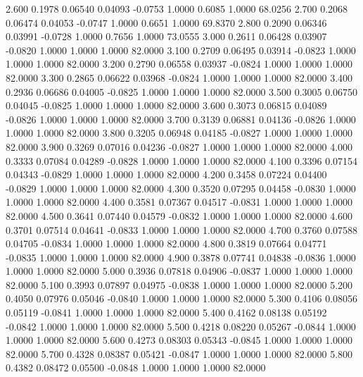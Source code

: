    2.600   0.1978   0.06540   0.04093  -0.0753   1.0000   0.6085   1.0000  68.0256
   2.700   0.2068   0.06474   0.04053  -0.0747   1.0000   0.6651   1.0000  69.8370
   2.800   0.2090   0.06346   0.03991  -0.0728   1.0000   0.7656   1.0000  73.0555
   3.000   0.2611   0.06428   0.03907  -0.0820   1.0000   1.0000   1.0000  82.0000
   3.100   0.2709   0.06495   0.03914  -0.0823   1.0000   1.0000   1.0000  82.0000
   3.200   0.2790   0.06558   0.03937  -0.0824   1.0000   1.0000   1.0000  82.0000
   3.300   0.2865   0.06622   0.03968  -0.0824   1.0000   1.0000   1.0000  82.0000
   3.400   0.2936   0.06686   0.04005  -0.0825   1.0000   1.0000   1.0000  82.0000
   3.500   0.3005   0.06750   0.04045  -0.0825   1.0000   1.0000   1.0000  82.0000
   3.600   0.3073   0.06815   0.04089  -0.0826   1.0000   1.0000   1.0000  82.0000
   3.700   0.3139   0.06881   0.04136  -0.0826   1.0000   1.0000   1.0000  82.0000
   3.800   0.3205   0.06948   0.04185  -0.0827   1.0000   1.0000   1.0000  82.0000
   3.900   0.3269   0.07016   0.04236  -0.0827   1.0000   1.0000   1.0000  82.0000
   4.000   0.3333   0.07084   0.04289  -0.0828   1.0000   1.0000   1.0000  82.0000
   4.100   0.3396   0.07154   0.04343  -0.0829   1.0000   1.0000   1.0000  82.0000
   4.200   0.3458   0.07224   0.04400  -0.0829   1.0000   1.0000   1.0000  82.0000
   4.300   0.3520   0.07295   0.04458  -0.0830   1.0000   1.0000   1.0000  82.0000
   4.400   0.3581   0.07367   0.04517  -0.0831   1.0000   1.0000   1.0000  82.0000
   4.500   0.3641   0.07440   0.04579  -0.0832   1.0000   1.0000   1.0000  82.0000
   4.600   0.3701   0.07514   0.04641  -0.0833   1.0000   1.0000   1.0000  82.0000
   4.700   0.3760   0.07588   0.04705  -0.0834   1.0000   1.0000   1.0000  82.0000
   4.800   0.3819   0.07664   0.04771  -0.0835   1.0000   1.0000   1.0000  82.0000
   4.900   0.3878   0.07741   0.04838  -0.0836   1.0000   1.0000   1.0000  82.0000
   5.000   0.3936   0.07818   0.04906  -0.0837   1.0000   1.0000   1.0000  82.0000
   5.100   0.3993   0.07897   0.04975  -0.0838   1.0000   1.0000   1.0000  82.0000
   5.200   0.4050   0.07976   0.05046  -0.0840   1.0000   1.0000   1.0000  82.0000
   5.300   0.4106   0.08056   0.05119  -0.0841   1.0000   1.0000   1.0000  82.0000
   5.400   0.4162   0.08138   0.05192  -0.0842   1.0000   1.0000   1.0000  82.0000
   5.500   0.4218   0.08220   0.05267  -0.0844   1.0000   1.0000   1.0000  82.0000
   5.600   0.4273   0.08303   0.05343  -0.0845   1.0000   1.0000   1.0000  82.0000
   5.700   0.4328   0.08387   0.05421  -0.0847   1.0000   1.0000   1.0000  82.0000
   5.800   0.4382   0.08472   0.05500  -0.0848   1.0000   1.0000   1.0000  82.0000
